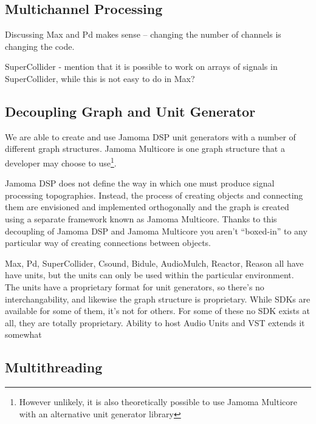\documentclass[twoside,a4paper]{article}
\begin{document}


\subsection{Multichannel Processing} %
Discussing Max and Pd makes sense -- changing the number of channels is changing the code.

SuperCollider - mention that it is possible to work on arrays of signals in SuperCollider, while this is not easy to do in Max?




\subsection{Decoupling Graph and Unit Generator} %

We are able to create and use Jamoma DSP unit generators with a number of different graph structures.  Jamoma Multicore is one graph structure that a developer may choose to use\footnote{However unlikely, it is also theoretically possible to use Jamoma Multicore with an alternative unit generator library}.

Jamoma DSP does not define the way in which one must produce signal processing topographies.  Instead, the process of creating objects and connecting them are envisioned and implemented orthogonally and the graph is created using a separate framework known as Jamoma Multicore.  Thanks to this decoupling of Jamoma DSP and Jamoma Multicore you aren't ``boxed-in'' to any particular way of creating connections between objects.

Max, Pd, SuperCollider, Csound, Bidule, AudioMulch, Reactor, Reason all have have units, but the units can only be used within the particular environment. The units have a proprietary format for unit generators, so there's no interchangability, and likewise the graph structure is proprietary. While SDKs are available for some of them, it's not for others. For some of these no SDK exists at all, they are totally proprietary. Ability to host Audio Units and VST extends it somewhat



\subsection{Multithreading} %
\end{document}
